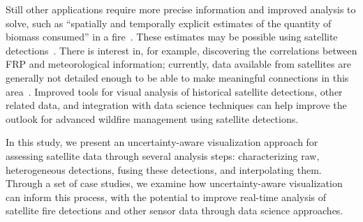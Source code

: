 Still other applications require more precise information and improved analysis to solve, such as ``spatially and temporally explicit estimates of the quantity of biomass consumed'' in a fire~\cite{Giglio2006}. These estimates may be possible using satellite detections~\cite{Zhang2011}. There is interest in, for example, discovering the correlations between FRP and meteorological information; currently, data available from satellites are generally not detailed enough to be able to make meaningful connections in this area~\cite{Peterson2012b}. Improved tools for visual analysis of historical satellite detections, other related data, and integration with data science techniques can help improve the outlook for advanced wildfire management using satellite detections.

In this study, we present an uncertainty-aware visualization approach for assessing satellite data through several analysis steps: characterizing raw, heterogeneous detections, fusing these detections, and interpolating them. Through a set of case studies, we examine how uncertainty-aware visualization can inform this process, with the potential to improve real-time analysis of satellite fire detections and other sensor data through data science approaches.






